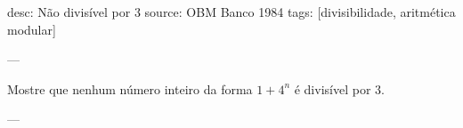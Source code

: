 desc: Não divisível por $3$
source:  OBM Banco 1984
tags:  [divisibilidade, aritmética modular]

---

Mostre que nenhum número inteiro da forma $1 + 4^n$ é divisível por $3$.

---

